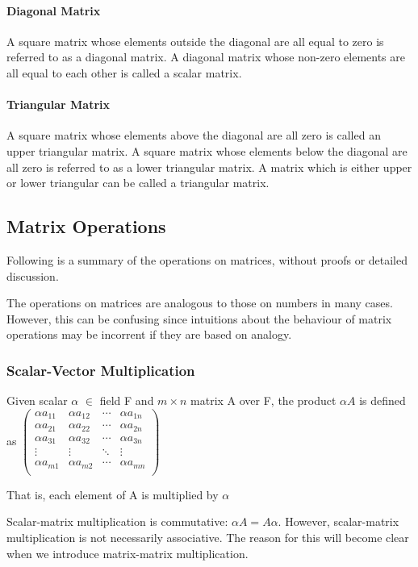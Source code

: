 \documentclass[12pt,letterpaper,final]{article}
\begin{document}
\paragraph{Diagonal Matrix} A square matrix whose elements outside the diagonal are all equal to zero is referred to as a diagonal matrix. A diagonal matrix whose non-zero elements are all equal to each other is called a scalar matrix. 

\paragraph{Triangular Matrix} A square matrix whose elements above the diagonal are all zero is called an upper triangular matrix. A square matrix whose elements below the diagonal are all zero is referred to as a lower triangular matrix. A matrix which is either upper or lower triangular can be called a triangular matrix. 

 
\subsection{Matrix Operations}
Following is a summary of the operations on matrices, without proofs or detailed discussion. 

The operations on matrices are analogous to those on numbers in many cases. However, this can be confusing since intuitions about the behaviour of matrix operations may be incorrent if they are based on analogy. 

\subsubsection{Scalar-Vector Multiplication}
Given scalar $\alpha$ $\in$ field F and $m \times n$ matrix A over F, the product $\alpha A$ is defined as 
$
 \begin{pmatrix}
\alpha a_{11} &\alpha  a_{12} &  \cdots & \alpha   a_{1n} \\
\alpha a_{21} &\alpha  a_{22} &  \cdots & \alpha  a_{2n}\\
\alpha a_{31} &\alpha  a_{32} &  \cdots & \alpha   a_{3n}\\
  \vdots  & \vdots  & \ddots & \vdots  \\
\alpha a_{m1} &\alpha  a_{m2} &  \cdots & \alpha  a_{mn}\\
 \end{pmatrix}
$

That is, each element of A is multiplied by $\alpha$

Scalar-matrix multiplication is commutative: $\alpha A = A \alpha$. However, scalar-matrix multiplication is not necessarily associative. The reason for this will become clear when we introduce matrix-matrix multiplication. 
\end{document}
